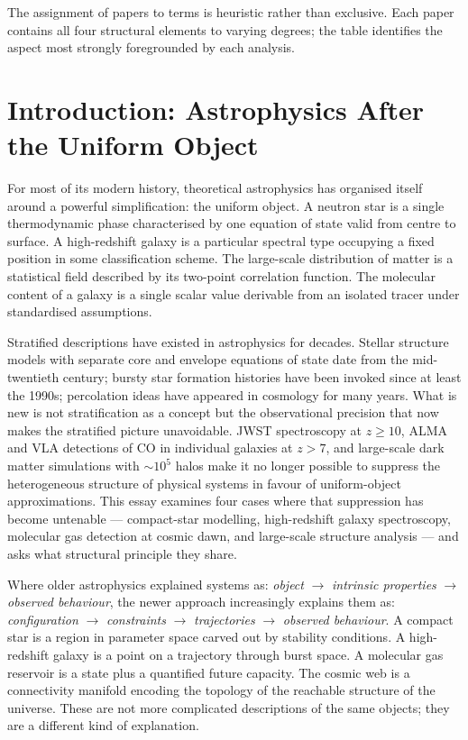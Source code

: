 \documentclass[12pt, oneside]{article}
\begin{document}
\smallskip
\noindent
The assignment of papers to terms is heuristic rather than exclusive. Each paper contains all four structural elements to varying degrees; the table identifies the aspect most strongly foregrounded by each analysis.

\section{Introduction: Astrophysics After the Uniform Object}

For most of its modern history, theoretical astrophysics has organised itself around a powerful simplification: the uniform object. A neutron star is a single thermodynamic phase characterised by one equation of state valid from centre to surface. A high-redshift galaxy is a particular spectral type occupying a fixed position in some classification scheme. The large-scale distribution of matter is a statistical field described by its two-point correlation function. The molecular content of a galaxy is a single scalar value derivable from an isolated tracer under standardised assumptions.

Stratified descriptions have existed in astrophysics for decades. Stellar structure models with separate core and envelope equations of state date from the mid-twentieth century; bursty star formation histories have been invoked since at least the 1990s; percolation ideas have appeared in cosmology for many years. What is new is not stratification as a concept but the observational precision that now makes the stratified picture unavoidable. JWST spectroscopy at $z \geq 10$, ALMA and VLA detections of CO in individual galaxies at $z > 7$, and large-scale dark matter simulations with $\sim 10^5$ halos make it no longer possible to suppress the heterogeneous structure of physical systems in favour of uniform-object approximations. This essay examines four cases where that suppression has become untenable --- compact-star modelling, high-redshift galaxy spectroscopy, molecular gas detection at cosmic dawn, and large-scale structure analysis --- and asks what structural principle they share.

Where older astrophysics explained systems as: \textit{object} $\to$ \textit{intrinsic properties} $\to$ \textit{observed behaviour}, the newer approach increasingly explains them as: \textit{configuration} $\to$ \textit{constraints} $\to$ \textit{trajectories} $\to$ \textit{observed behaviour}. A compact star is a region in parameter space carved out by stability conditions. A high-redshift galaxy is a point on a trajectory through burst space. A molecular gas reservoir is a state plus a quantified future capacity. The cosmic web is a connectivity manifold encoding the topology of the reachable structure of the universe. These are not more complicated descriptions of the same objects; they are a different kind of explanation.
\end{document}
